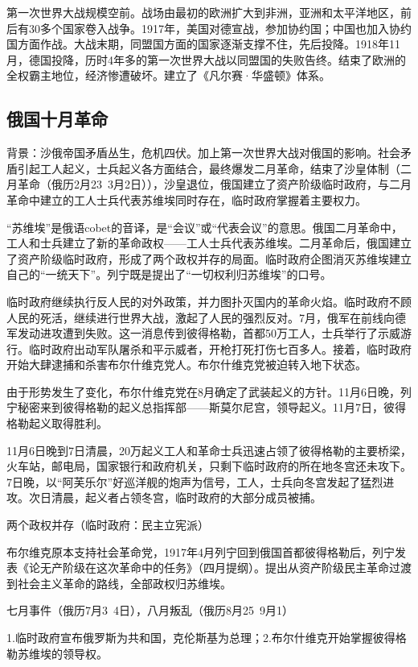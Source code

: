 第一次世界大战规模空前。战场由最初的欧洲扩大到非洲，亚洲和太平洋地区，前后有30多个国家卷入战争。1917年，美国对德宣战，参加协约国；中国也加入协约国方面作战。大战末期，同盟国方面的国家逐渐支撑不住，先后投降。1918年11月，德国投降，历时4年多的第一次世界大战以同盟国的失败告终。结束了欧洲的全权霸主地位，经济惨遭破坏。建立了《凡尔赛·华盛顿》体系。

\subsection{俄国十月革命}
背景：沙俄帝国矛盾丛生，危机四伏。加上第一次世界大战对俄国的影响。社会矛盾引起工人起义，士兵起义各方面结合，最终爆发二月革命，结束了沙皇体制（二月革命（俄历2月23~3月2日）），沙皇退位，俄国建立了资产阶级临时政府，与二月革命中建立的工人士兵代表苏维埃同时存在，临时政府掌握着主要权力。

“苏维埃”是俄语cobet的音译，是“会议”或“代表会议”的意思。俄国二月革命中，工人和士兵建立了新的革命政权——工人士兵代表苏维埃。二月革命后，俄国建立了资产阶级临时政府，形成了两个政权并存的局面。临时政府企图消灭苏维埃建立自己的“一统天下”。列宁既是提出了“一切权利归苏维埃”的口号。

临时政府继续执行反人民的对外政策，并力图扑灭国内的革命火焰。临时政府不顾人民的死活，继续进行世界大战，激起了人民的强烈反对。7月，俄军在前线向德军发动进攻遭到失败。这一消息传到彼得格勒，首都50万工人，士兵举行了示威游行。临时政府出动军队屠杀和平示威者，开枪打死打伤七百多人。接着，临时政府开始大肆逮捕和杀害布尔什维克党人。布尔什维克党被迫转入地下状态。

由于形势发生了变化，布尔什维克党在8月确定了武装起义的方针。11月6日晚，列宁秘密来到彼得格勒的起义总指挥部——斯莫尔尼宫，领导起义。11月7日，彼得格勒起义取得胜利。

11月6日晚到7日清晨，20万起义工人和革命士兵迅速占领了彼得格勒的主要桥梁，火车站，邮电局，国家银行和政府机关，只剩下临时政府的所在地冬宫还未攻下。7日晚，以“阿芙乐尔”好巡洋舰的炮声为信号，工人，士兵向冬宫发起了猛烈进攻。次日清晨，起义者占领冬宫，临时政府的大部分成员被捕。

两个政权并存（临时政府：民主立宪派）

布尔维克原本支持社会革命党，1917年4月列宁回到俄国首都彼得格勒后，列宁发表《论无产阶级在这次革命中的任务》（四月提纲）。提出从资产阶级民主革命过渡到社会主义革命的路线，全部政权归苏维埃。

七月事件（俄历7月3~4日），八月叛乱（俄历8月25~9月1）

1.临时政府宣布俄罗斯为共和国，克伦斯基为总理；2.布尔什维克开始掌握彼得格勒苏维埃的领导权。

